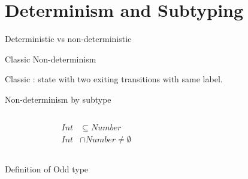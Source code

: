 \section{Determinism and Subtyping}

\begin{frame}{Deterministic vs non-deterministic}
  
\end{frame}

\begin{frame}{Classic Non-determinism}
  \centering
  
  \scalebox{0.95}{}

  Classic : state with two exiting transitions with same label.

\end{frame}

\begin{frame}{Non-determinism by subtype}
  \begin{columns}[T]
    \begin{column}{0.35\textwidth}
      \centering
      
      \begin{align*}
        Int&\subseteq Number\\
        Int &\cap Number \neq \emptyset
      \end{align*}%
      \scalebox{0.8}{}%
    \end{column}%
    \begin{column}{0.65\textwidth}
      \only<1>{\scalebox{0.9}{}}%
    \end{column}
  \end{columns}
\end{frame}



\newsavebox\oddbox
\begin{lrbox}{\oddbox}
  \begin{minipage}{11cm}
    
  \end{minipage}
\end{lrbox}

\begin{frame}{Definition of Odd type}
  \usebox\oddbox
\end{frame}


